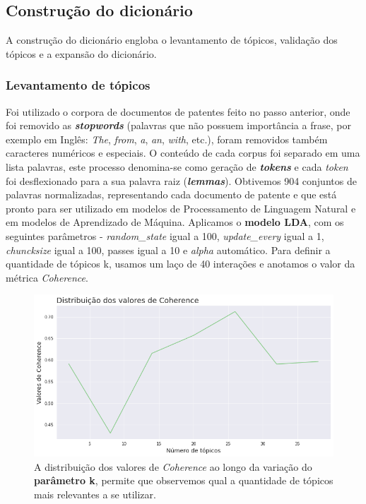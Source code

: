 \subsection{Construção do dicionário}

A construção do dicionário engloba o levantamento de tópicos, validação dos tópicos e a expansão do dicionário.

\subsubsection{Levantamento de tópicos}

Foi utilizado o corpora de documentos de patentes feito no passo anterior, onde foi removido as \textbf{\textit{stopwords}} (palavras que não possuem importância a frase, por exemplo em Inglês: \textit{The}, \textit{from}, \textit{a}, \textit{an}, \textit{with}, etc.), foram removidos também caracteres numéricos e especiais. O conteúdo de cada corpus foi separado em uma lista palavras, este processo denomina-se como geração de \textbf{\textit{tokens}} e cada \textit{token} foi desflexionado para a sua palavra raiz (\textbf{\textit{lemmas}}). Obtivemos 904 conjuntos de palavras normalizadas, representando cada documento de patente e que está pronto para ser utilizado em modelos de Processamento de Linguagem Natural e em modelos de Aprendizado de Máquina.
Aplicamos o \textbf{modelo LDA}, com os seguintes parâmetros - \textit{random\_state} igual a 100, \textit{update\_every} igual a 1, \textit{chuncksize} igual a 100, passes igual a 10 e \textit{alpha} automático. Para definir a quantidade de tópicos k, usamos um laço de 40 interações e anotamos o valor da métrica \textit{Coherence}.

\begin{figure}[ht!]
	\centering
	\includegraphics[scale=0.6]{imagens/distr_dos_valores_de_coherence.png}
	\caption{A distribuição dos valores de \textit{Coherence} ao longo da variação do \textbf{parâmetro k}, permite que observemos qual a quantidade de tópicos mais relevantes a se utilizar.
			 \label{dist_coherence_image}}
\end{figure}

